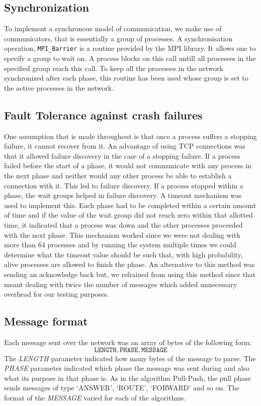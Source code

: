 \subsection{Synchronization}
To implement a synchronous model of communication, we make use of communicators, that is essentially a group of processes. A synchronisation operation, \texttt{MPI\_Barrier} is a routine provided by the MPI library. It allows one to specify a group to wait on. A process blocks on this call untill all processes in the specified group reach this call. To keep all the processes in the network synchronized after each phase, this routine has been used whose group is set to the active processes in the network.



\subsection{Fault Tolerance against crash failures}
One assumption that is made throughout is that once a process suffers a stopping failure, it cannot recover from it. An advantage of using TCP connections was that it allowed failure discovery in the case of a stopping failure. If a process failed before the start of a phase, it would not communicate with any process in the next phase and neither would any other process be able to establish a connection with it. This led to failure discovery. If a process stopped within a phase, the wait groups helped in failure discovery. A timeout mechanism was used to implement this. Each phase had to be completed within a certain amount of time and if the value of the wait group did not reach zero within that allotted time, it indicated that a process was down and the other processes proceeded with the next phase. This mechanism worked since we were not dealing with more than $64$ processes and by running the system multiple times we could determine what the timeout value should be such that, with high probability, alive processes are allowed to finish the phase. An alternative to this method was sending an acknowledge back but, we refrained from using this method since that meant dealing with twice the number of messages which added unnecessary overhead for our testing purposes. 

\subsection{Message format}
Each message sent over the network was an array of bytes of the following form:
\begin{equation*}
    \mathtt{LENGTH}, \mathtt{PHASE}, \mathtt{MESSAGE}
\end{equation*}
The \textit{LENGTH} parameter indicated how many bytes of the message to parse. The \textit{PHASE} parameter indicated which phase the message was sent during and also what its purpose in that phase is. As in the algorithm Pull-Push, the pull phase sends messages of type `ANSWER', `ROUTE', `FORWARD' and so on. The format of the \textit{MESSAGE} varied for each of the algorithms.


